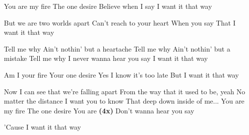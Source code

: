 \begin{verse*}
You are my fire
The one desire
Believe when I say
I want it that way
\end{verse*}

\begin{verse*}
But we are two worlds apart
Can’t reach to your heart
When you say
That I want it that way
\end{verse*}

\begin{chorus}
Tell me why
Ain’t nothin’ but a heartache
Tell me why
Ain’t nothin’ but a mistake
Tell me why
I never wanna hear you say
I want it that way
\end{chorus}

\begin{verse*}
Am I your fire
Your one desire
Yes I know it’s too late
But I want it that way
\end{verse*}

\thechorus

\begin{verse*}
Now I can see that we’re falling apart
From the way that it used to be, yeah
No matter the distance
I want you to know
That deep down inside of me...
You are my fire
The one desire
You are \textbf{(4x)}
Don’t wanna hear you say
\end{verse*}

\thechorus

\begin{verse*}
’Cause I want it that way
\end{verse*}